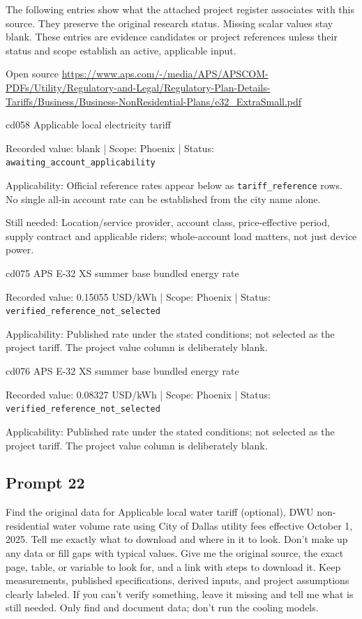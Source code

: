 The following entries show what the attached project register associates with this source. They preserve the original research status. Missing scalar values stay blank. These entries are evidence candidates or project references unless their status and scope establish an active, applicable input.

Open source  \url{https://www.aps.com/-/media/APS/APSCOM-PDFs/Utility/Regulatory-and-Legal/Regulatory-Plan-Details-Tariffs/Business/Business-NonResidential-Plans/e32_ExtraSmall.pdf}

cd058  Applicable local electricity tariff

Recorded value: blank | Scope: Phoenix | Status: \nolinkurl{awaiting_account_applicability}

Applicability: Official reference rates appear below as \nolinkurl{tariff_reference} rows. No single all-in account rate can be established from the city name alone.

Still needed: Location/service provider, account class, price-effective period, supply contract and applicable riders; whole-account load matters, not just device power.

cd075  APS E-32 XS summer base bundled energy rate

Recorded value: 0.15055 USD/kWh | Scope: Phoenix | Status: \nolinkurl{verified_reference_not_selected}

Applicability: Published rate under the stated conditions; not selected as the project tariff. The project value column is deliberately blank.

cd076  APS E-32 XS summer base bundled energy rate

Recorded value: 0.08327 USD/kWh | Scope: Phoenix | Status: \nolinkurl{verified_reference_not_selected}

Applicability: Published rate under the stated conditions; not selected as the project tariff. The project value column is deliberately blank.

\subsection*{Prompt 22}
Find the original data for Applicable local water tariff (optional), DWU non-residential water volume rate using City of Dallas utility fees effective October 1, 2025. Tell me exactly what to download and where in it to look. Don’t make up any data or fill gaps with typical values. Give me the original source, the exact page, table, or variable to look for, and a link with steps to download it. Keep measurements, published specifications, derived inputs, and project assumptions clearly labeled. If you can’t verify something, leave it missing and tell me what is still needed. Only find and document data; don’t run the cooling models.

